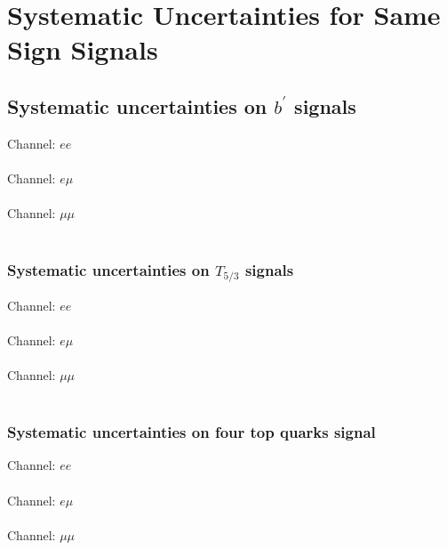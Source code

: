 

\section{Systematic Uncertainties for Same Sign Signals}

\subsection{Systematic uncertainties on $b^\prime$ signals}
\label{App:SameSignSystematics}

\begin{centering}
\tiny
Channel: $ee$ \\

\\
Channel: $e \mu$ \\

\\
Channel: $\mu \mu$ \\

\\
\label{tab:systematicsBprime}
\end{centering}


\subsubsection{Systematic uncertainties on $T_{5/3}$ signals}
\begin{centering}
\tiny
Channel: $ee$ \\

\\
Channel: $e \mu$ \\

\\
Channel: $\mu \mu$ \\

\\
\label{tab:systematicsT53}
\end{centering}


\subsubsection{Systematic uncertainties on four top quarks signal}
\begin{centering}
\tiny
Channel: $ee$ \\

\\
Channel: $e \mu$ \\

\\
Channel: $\mu \mu$ \\

\\
\label{tab:systematics4t}
\end{centering}


